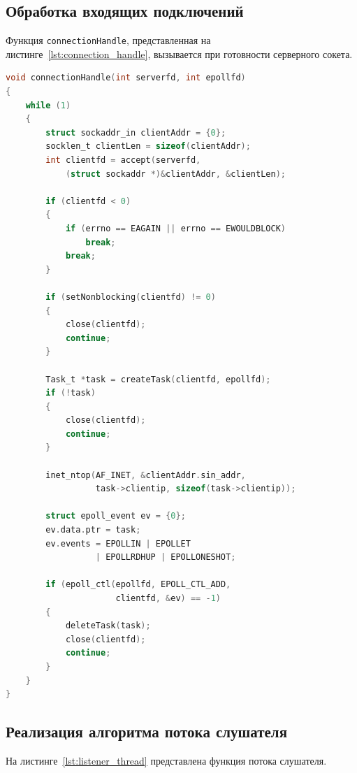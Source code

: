 \subsection{Обработка входящих подключений}
Функция \texttt{connectionHandle}, представленная на листинге~\ref{lst:connection_handle},
вызывается при готовности серверного сокета.


\begin{lstlisting}[caption={Обработка входящих подключений},label={lst:connection_handle},language=C]
void connectionHandle(int serverfd, int epollfd)
{
    while (1)
    {
        struct sockaddr_in clientAddr = {0};
        socklen_t clientLen = sizeof(clientAddr);
        int clientfd = accept(serverfd,
            (struct sockaddr *)&clientAddr, &clientLen);

        if (clientfd < 0)
        {
            if (errno == EAGAIN || errno == EWOULDBLOCK)
                break;
            break;
        }

        if (setNonblocking(clientfd) != 0)
        {
            close(clientfd);
            continue;
        }

        Task_t *task = createTask(clientfd, epollfd);
        if (!task)
        {
            close(clientfd);
            continue;
        }

        inet_ntop(AF_INET, &clientAddr.sin_addr,
                  task->clientip, sizeof(task->clientip));

        struct epoll_event ev = {0};
        ev.data.ptr = task;
        ev.events = EPOLLIN | EPOLLET
                  | EPOLLRDHUP | EPOLLONESHOT;

        if (epoll_ctl(epollfd, EPOLL_CTL_ADD,
                      clientfd, &ev) == -1)
        {
            deleteTask(task);
            close(clientfd);
            continue;
        }
    }
}
\end{lstlisting}

\subsection{Реализация алгоритма потока слушателя}
На листинге~\ref{lst:listener_thread} представлена функция потока слушателя.


